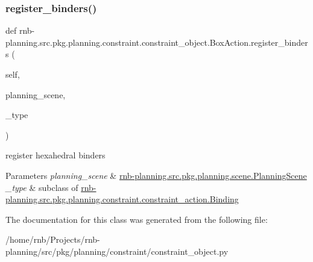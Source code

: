 \subsubsection{\texorpdfstring{register\+\_\+binders()}{register\_binders()}}
{\footnotesize\ttfamily def rnb-\/planning.\+src.\+pkg.\+planning.\+constraint.\+constraint\+\_\+object.\+Box\+Action.\+register\+\_\+binders (\begin{DoxyParamCaption}\item[{}]{self,  }\item[{}]{planning\+\_\+scene,  }\item[{}]{\+\_\+type }\end{DoxyParamCaption})}



register hexahedral binders 


\begin{DoxyParams}{Parameters}
{\em planning\+\_\+scene} & \hyperlink{classrnb-planning_1_1src_1_1pkg_1_1planning_1_1scene_1_1_planning_scene}{rnb-\/planning.\+src.\+pkg.\+planning.\+scene.\+Planning\+Scene} \\
\hline
{\em \+\_\+type} & subclass of \hyperlink{classrnb-planning_1_1src_1_1pkg_1_1planning_1_1constraint_1_1constraint__action_1_1_binding}{rnb-\/planning.\+src.\+pkg.\+planning.\+constraint.\+constraint\+\_\+action.\+Binding} \\
\hline
\end{DoxyParams}


The documentation for this class was generated from the following file\+:\begin{DoxyCompactItemize}
\item 
/home/rnb/\+Projects/rnb-\/planning/src/pkg/planning/constraint/constraint\+\_\+object.\+py\end{DoxyCompactItemize}
